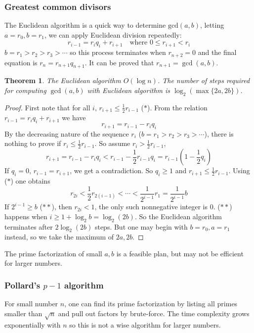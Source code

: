 \documentclass[12pt]{article}
\newtheorem{theorem}{Theorem}[subsection]
\theoremstyle{remark}
\theoremstyle{definition}
\begin{document}
    \subsubsection{Greatest common divisors}
        The Euclidean algorithm is a quick way to determine $\text{gcd}(a, b)$, letting $a = r_0, b = r_1$, we can apply Euclidean division repeatedly: 
        $$r_{i-1} = r_i q_i + r_{i+1} \quad \text{where } 0 \leq r_{i+1} < r_i$$
        $b = r_1 > r_2 > r_3 > \cdots$ so this process terminates when $r_{n+2} = 0$ and the final equation is $r_n = r_{n+1} q_{n+1}$. It can be proved that $r_{n+1} = \gcd(a, b)$. 
        \begin{theorem}
            The Euclidean algorithm $O(\log n)$. The number of steps required for computing $\gcd(a, b)$ with Euclidean algorithm is $\log_2(\max\{2a, 2b\})$.
        \end{theorem}
        \begin{proof}
            First note that for all $i$, $r_{i+1} \leq \frac{1}{2} r_{i-1}$ ($*$). From the relation $r_{i-1} = r_i q_i + r_{i+1}$ we have 
            $$r_{i+1} = r_{i-1} - r_i q_i$$
            By the decreasing nature of the sequence $r_i$ ($b = r_1 > r_2 > r_3 > \cdots$), there is nothing to prove if $r_i \leq \frac{1}{2} r_{i-1}$. So assume $r_i > \frac{1}{2} r_{i-1}$, 
            $$r_{i+1} = r_{i-1} - r_i q_i < r_{i-1} - \frac{1}{2} r_{i-1} q_i = r_{i-1} \left(1-\frac{1}{2} q_i\right)$$
            If $q_i = 0$, $r_{i-1} = r_{i+1}$, we get a contradiction. So $q_i \geq 1$ and $r_{i+1} \leq \frac{1}{2}r_{i-1}$.  Using ($*$) one obtains
            $$r_{2i} < \frac{1}{2} r_{2(i-1)} < \cdots < \frac{1}{2^{i-1}}r_1 = \frac{1}{2^{i-1}} b$$
            If $2^{i-1} \geq b$ ($**$), then $r_{2i} < 1$, the only such nonnegative integer is $0$. ($**$) happens when $i \geq 1+\log_2{b} = \log_2(2b)$. So the Euclidean algorithm terminates after $2\log_2(2b)$ steps. But one may begin with $b=r_0, a=r_1$ instead, so we take the maximum of $2a, 2b$. 
        \end{proof}
        The prime factorization of small $a,b $ is a feasible plan, but may not be efficient for larger numbers. 
        
    \subsubsection{Pollard's $p-1$ algorithm}
        For small number $n$, one can find its prime factorization by listing all primes smaller than $\sqrt{n}$ and pull out factors by brute-force. The time complexity grows exponentially with $n$ so this is not a wise algorithm for larger numbers.
        
\end{document}
